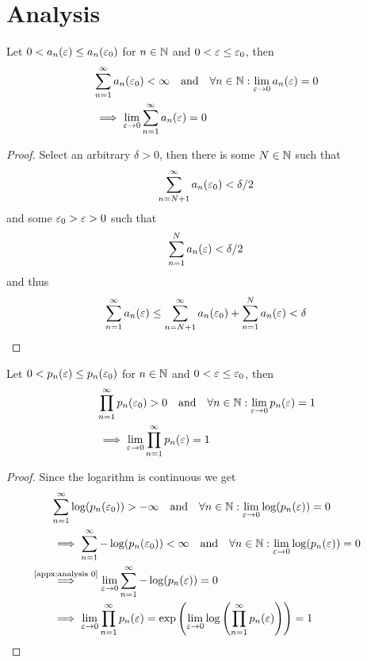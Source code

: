 \section{Analysis}
\begin{lemma}\label{appx:analysis 0}
    Let \(0<a_n(\varepsilon)\le a_n(\varepsilon_0)\) for \(n\in\mathbb{N}\) and  \(0<\varepsilon\le \varepsilon_0\), then
    \begin{align*}
        &\sum_{n=1}^\infty a_n(\varepsilon_0) < \infty 
        \quad\text{and}\quad \forall n\in\mathbb{N}: \lim_{\varepsilon\to 0} a_n(\varepsilon)= 0 \\
        &\implies \lim_{\varepsilon\to 0}\sum_{n=1}^\infty a_n(\varepsilon)=0
    \end{align*}
\end{lemma}
\begin{proof}
    Select an arbitrary \(\delta>0\), then there is some \(N\in\mathbb{N}\) such that
    \[
        \sum_{n=N+1}^\infty a_n(\varepsilon_0) < \delta/2
    \]
    and some \(\varepsilon_0>\varepsilon>0\) such that
    \[
        \sum_{n=1}^N a_n(\varepsilon)<\delta/2
    \]
    and thus
    \[
        \sum_{n=1}^\infty a_n(\varepsilon)
        \le \sum_{n=N+1}^\infty a_n(\varepsilon_0) +\sum_{n=1}^N a_n(\varepsilon)<\delta \qedhere
    \]
\end{proof}
\begin{lemma}\label{appx:analysis 1}
    Let \(0<p_n(\varepsilon)\le p_n(\varepsilon_0)\) for \(n\in\mathbb{N}\) and \(0<\varepsilon \le \varepsilon_0\), then
    \begin{align*}
        &\prod_{n=1}^\infty p_n(\varepsilon_0) > 0 
        \quad\text{and}\quad \forall n\in\mathbb{N}: \lim_{\varepsilon\to 0} p_n(\varepsilon)= 1 \\
        &\implies \lim_{\varepsilon\to 0}\prod_{n=1}^\infty p_n(\varepsilon)=1
    \end{align*}
\end{lemma}
\begin{proof}
    Since the logarithm is continuous we get
    \begin{align*}
        &\sum_{n=1}^\infty \log(p_n(\vep_0))>-\infty \quad \text{and}\quad \forall n\in\N: \lim_{\vep\to 0} \log(p_n(\vep))= 0\\
        &\implies \sum_{n=1}^\infty -\log(p_n(\vep_0))<\infty \quad \text{and}\quad \forall n\in\N: \lim_{\vep\to 0} \log(p_n(\vep))= 0\\
        &\lximplies{\text{\ref{appx:analysis 0}}} \lim_{\vep\to 0} 
        \sum_{n=1}^\infty -\log(p_n(\vep)) =0\\
        &\implies \lim_{\vep\to 0}\prod_{n=1}^\infty p_n(\vep)=\exp\left( 
            \lim_{\vep\to 0}\log\left( \prod_{n=1}^\infty p_n(\vep) \right)
        \right)=1\qedhere
    \end{align*}
\end{proof}

